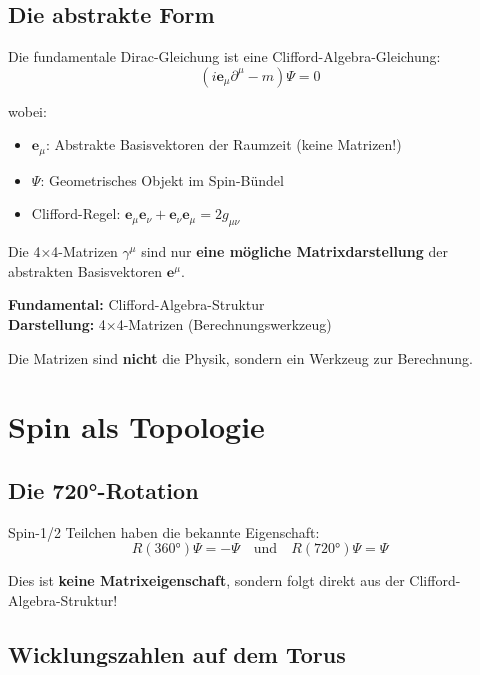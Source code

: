 	\subsection{Die abstrakte Form}
	
	Die fundamentale Dirac-Gleichung ist eine Clifford-Algebra-Gleichung:
	\begin{equation}
		\boxed{(i \mathbf{e}_\mu \partial^\mu - m)\Psi = 0}
	\end{equation}
	
	wobei:
	\begin{itemize}
		\item $\mathbf{e}_\mu$: Abstrakte Basisvektoren der Raumzeit (keine Matrizen!)
		\item $\Psi$: Geometrisches Objekt im Spin-Bündel
		\item Clifford-Regel: $\mathbf{e}_\mu \mathbf{e}_\nu + \mathbf{e}_\nu \mathbf{e}_\mu = 2g_{\mu\nu}$
	\end{itemize}
	
	Die 4×4-Matrizen $\gamma^\mu$ sind nur \textbf{eine mögliche Matrixdarstellung} 
	der abstrakten Basisvektoren $\mathbf{e}^\mu$.
	
	\begin{keypoint}
		\textbf{Fundamental:} Clifford-Algebra-Struktur \\
		\textbf{Darstellung:} 4×4-Matrizen (Berechnungswerkzeug)
		
		Die Matrizen sind \textbf{nicht} die Physik, sondern ein Werkzeug zur Berechnung.
	\end{keypoint}
	
	\section{Spin als Topologie}
	
	\subsection{Die 720°-Rotation}
	
	Spin-1/2 Teilchen haben die bekannte Eigenschaft:
	\begin{equation}
		R(360°)\Psi = -\Psi \quad \text{und} \quad R(720°)\Psi = \Psi
	\end{equation}
	
	Dies ist \textbf{keine Matrixeigenschaft}, sondern folgt direkt aus der 
	Clifford-Algebra-Struktur!
	
	\subsection{Wicklungszahlen auf dem Torus}
	
